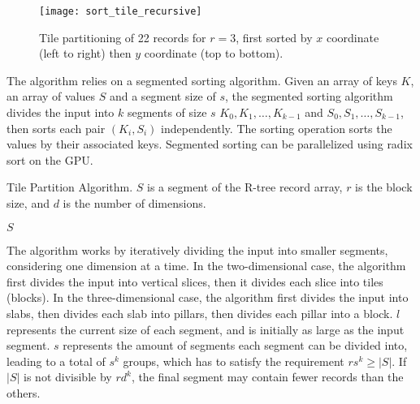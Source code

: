 \begin{figure}[h]
    \centering
    \texttt{[image: sort\_tile\_recursive]}
    \caption{Tile partitioning of 22 records for \(r = 3\), first sorted by \(x\) coordinate (left to right) then \(y\) coordinate (top to bottom).}
    \label{fig:sort-tile-recursive}
\end{figure}

The algorithm relies on a segmented sorting algorithm. Given an array of keys \(K\), an array of values \(S\) and a segment size of \(s\), the segmented sorting algorithm divides the input into \(k\) segments of size \(s\) \(K_0, K_1, \dotsc, K_{k - 1}\) and \(S_0, S_1, \dotsc, S_{k - 1}\), then sorts each pair \((K_i, S_i)\) independently. The sorting operation sorts the values by their associated keys. Segmented sorting can be parallelized using radix sort on the GPU.

\begin{algorithm}
  \caption{Tile Partition Algorithm. \(S\) is a segment of the R-tree record array, \(r\) is the block size, and \(d\) is the number of dimensions.}
  \label{alg/tile-partition}
  \begin{algorithmic}[1]
        \EndFor
      \EndFor
      \State \Return \(S\) 
    \EndFunction
  \end{algorithmic}
\end{algorithm}

The algorithm works by iteratively dividing the input into smaller segments, considering one dimension at a time. In the two-dimensional case, the algorithm first divides the input into vertical slices, then it divides each slice into tiles (blocks). In the three-dimensional case, the algorithm first divides the input into slabs, then divides each slab into pillars, then divides each pillar into a block. \(l\) represents the current size of each segment, and is initially as large as the input segment. \(s\) represents the amount of segments each segment can be divided into, leading to a total of \(s^k\) groups, which has to satisfy the requirement \(r s^k \geq |S|\). If \(|S|\) is not divisible by \(r d^k\), the final segment may contain fewer records than the others.

